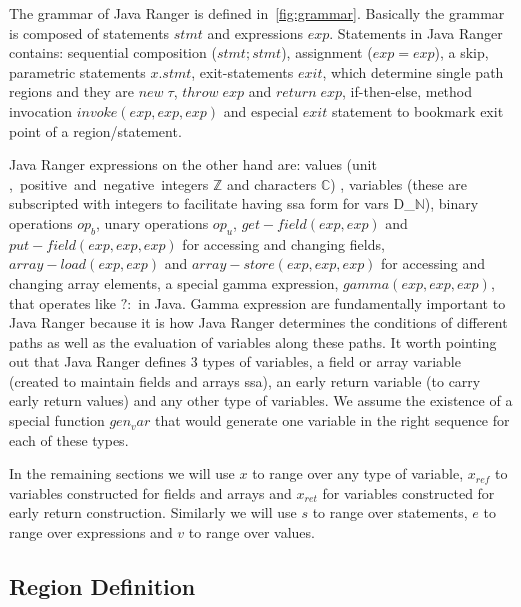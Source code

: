 The grammar of Java Ranger is defined in~\ref{fig:grammar}. Basically the grammar is composed of statements $stmt$ and expressions $exp$. Statements in Java Ranger contains: sequential composition ($stmt;stmt$), assignment ($exp = exp$), a skip, parametric statements $x.stmt$, exit-statements $exit$, which determine single path regions and they are $new\; \tau$, $throw\; exp$ and $return\; exp$, if-then-else, method invocation $invoke(exp, exp, exp)$ and especial $exit$ statement to bookmark exit point of a region/statement. 

Java Ranger expressions on the other hand are: values (unit \unit, positive and negative integers $\mathbb{Z}$ and characters $\mathbb{C}$) , variables (these are subscripted with integers to facilitate having ssa form for vars D_$\mathbb{N}$), binary operations $op_b$, unary operations $op_u$,  $get-field(exp, exp)$ and $put-field(exp, exp, exp)$ for accessing and changing fields,  $array-load(exp, exp)$ and  $array-store(exp, exp, exp)$ for accessing and changing array elements, a special gamma expression, $gamma(exp, exp, exp)$, that operates like $?:$ in Java. Gamma expression are fundamentally important to Java Ranger because it is how Java Ranger determines the conditions of different paths as well as the evaluation of variables along these paths.  
It worth pointing out that Java Ranger defines 3 types of variables, a field or array variable (created to maintain fields and arrays ssa), an early return variable (to carry early return values) and any other type of variables. We assume the existence of a special function $gen_var$ that would generate one variable in the right sequence for each of these types. 

In the remaining sections we will use $x$ to range over any type of variable, $x_{ref}$ to variables constructed for fields and arrays and $x_{ret}$ for variables constructed for early return construction. Similarly we will use $s$ to range over statements, $e$ to range over expressions and $v$ to range over values.
\iffalse
\begin{verbatim}

stmt ::= stmt ; 
   

\end{verbatim}

\vaibhav{assigned to Mike}
\mike{MWW: - we should provide an AST of the constraint language}
\fi 


\subsection{Region Definition}

